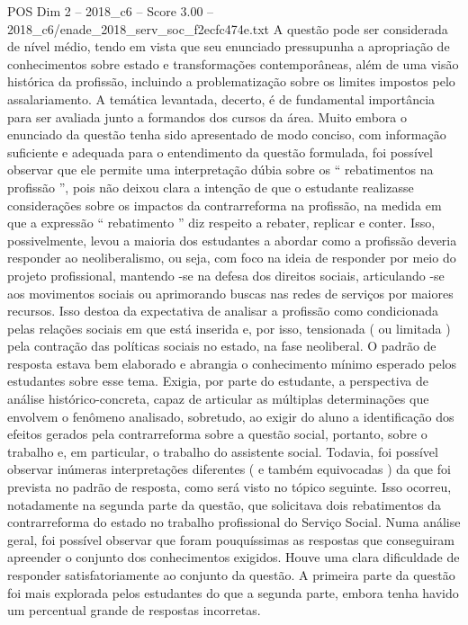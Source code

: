 \begin{textsample}{POS Dim 2 – 2018\_c6 – Score 3.00 – 2018\_c6/enade\_2018\_serv\_soc\_f2ecfc474e.txt}
A questão pode ser considerada de nível médio, tendo em vista que seu enunciado pressupunha a apropriação de conhecimentos sobre estado e transformações contemporâneas, além de uma visão histórica da profissão, incluindo a problematização sobre os limites impostos pelo assalariamento.
A temática levantada, decerto, é de fundamental importância para ser avaliada junto a formandos dos cursos da área.
Muito embora o enunciado da questão tenha sido apresentado de modo conciso, com informação suficiente e adequada para o entendimento da questão formulada, foi possível observar que ele permite uma interpretação dúbia sobre os “ rebatimentos na profissão ”, pois não deixou clara a intenção de que o estudante realizasse considerações sobre os impactos da contrarreforma na profissão, na medida em que a expressão “ rebatimento ” diz respeito a rebater, replicar e conter.
Isso, possivelmente, levou a maioria dos estudantes a abordar como a profissão deveria responder ao neoliberalismo, ou seja, com foco na ideia de responder por meio do projeto profissional, mantendo -se na defesa dos direitos sociais, articulando -se aos movimentos sociais ou aprimorando buscas nas redes de serviços por maiores recursos.
Isso destoa da expectativa de analisar a profissão como condicionada pelas relações sociais em que está inserida e, por isso, tensionada ( ou limitada ) pela contração das políticas sociais no estado, na fase neoliberal.
O padrão de resposta estava bem elaborado e abrangia o conhecimento mínimo esperado pelos estudantes sobre esse tema.
Exigia, por parte do estudante, a perspectiva de análise histórico-concreta, capaz de articular as múltiplas determinações que envolvem o fenômeno analisado, sobretudo, ao exigir do aluno a identificação dos efeitos gerados pela contrarreforma sobre a questão social, portanto, sobre o trabalho e, em particular, o trabalho do assistente social.
Todavia, foi possível observar inúmeras interpretações diferentes ( e também equivocadas ) da que foi prevista no padrão de resposta, como será visto no tópico seguinte.
Isso ocorreu, notadamente na segunda parte da questão, que solicitava dois rebatimentos da contrarreforma do estado no trabalho profissional do Serviço Social.
Numa análise geral, foi possível observar que foram pouquíssimas as respostas que conseguiram apreender o conjunto dos conhecimentos exigidos.
Houve uma clara dificuldade de responder satisfatoriamente ao conjunto da questão.
A primeira parte da questão foi mais explorada pelos estudantes do que a segunda parte, embora tenha havido um percentual grande de respostas incorretas.

\end{textsample}
